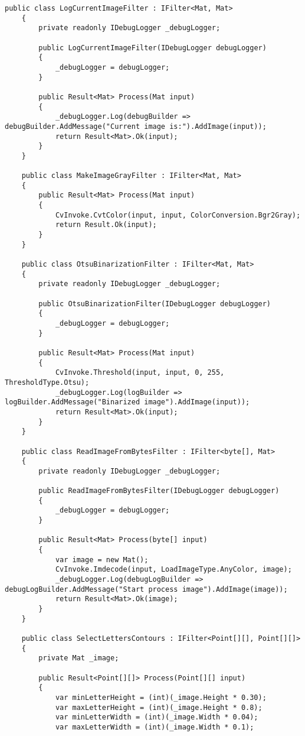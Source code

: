 \begin{lstlisting}[style=fsharpstyle,caption={Исходный код}, label=lst:recognition_result_handler]
    public class LogCurrentImageFilter : IFilter<Mat, Mat>
    {
        private readonly IDebugLogger _debugLogger;

        public LogCurrentImageFilter(IDebugLogger debugLogger)
        {
            _debugLogger = debugLogger;
        }

        public Result<Mat> Process(Mat input)
        {
            _debugLogger.Log(debugBuilder => debugBuilder.AddMessage("Current image is:").AddImage(input));
            return Result<Mat>.Ok(input);
        }
    }

    public class MakeImageGrayFilter : IFilter<Mat, Mat>
    {
        public Result<Mat> Process(Mat input)
        {
            CvInvoke.CvtColor(input, input, ColorConversion.Bgr2Gray);
            return Result.Ok(input);
        }
    }

    public class OtsuBinarizationFilter : IFilter<Mat, Mat>
    {
        private readonly IDebugLogger _debugLogger;

        public OtsuBinarizationFilter(IDebugLogger debugLogger)
        {
            _debugLogger = debugLogger;
        }

        public Result<Mat> Process(Mat input)
        {
            CvInvoke.Threshold(input, input, 0, 255, ThresholdType.Otsu);
            _debugLogger.Log(logBuilder => logBuilder.AddMessage("Binarized image").AddImage(input));
            return Result<Mat>.Ok(input);
        }
    }

    public class ReadImageFromBytesFilter : IFilter<byte[], Mat>
    {
        private readonly IDebugLogger _debugLogger;

        public ReadImageFromBytesFilter(IDebugLogger debugLogger)
        {
            _debugLogger = debugLogger;
        }

        public Result<Mat> Process(byte[] input)
        {
            var image = new Mat();
            CvInvoke.Imdecode(input, LoadImageType.AnyColor, image);
            _debugLogger.Log(debugLogBuilder => debugLogBuilder.AddMessage("Start process image").AddImage(image));
            return Result<Mat>.Ok(image);
        }
    }

    public class SelectLettersContours : IFilter<Point[][], Point[][]>
    {
        private Mat _image;

        public Result<Point[][]> Process(Point[][] input)
        {
            var minLetterHeight = (int)(_image.Height * 0.30);
            var maxLetterHeight = (int)(_image.Height * 0.8);
            var minLetterWidth = (int)(_image.Width * 0.04);
            var maxLetterWidth = (int)(_image.Width * 0.1);


\end{lstlisting}
